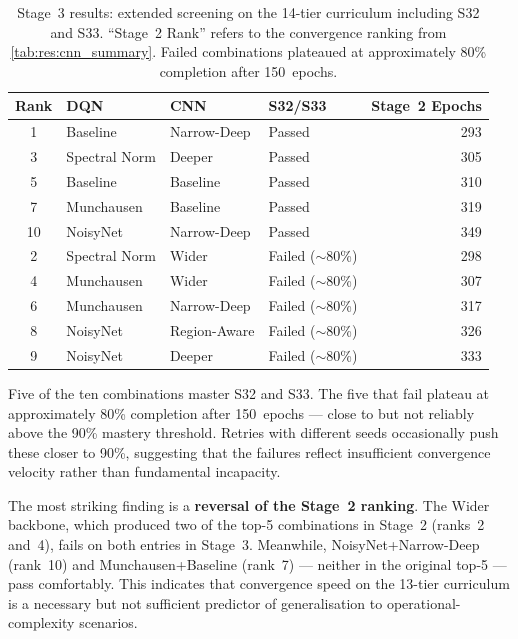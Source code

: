 \begin{table}[H]
  \centering
  \caption{Stage~3 results: extended screening on the 14-tier curriculum including S32 and S33. ``Stage~2 Rank'' refers to the convergence ranking from \cref{tab:res:cnn_summary}. Failed combinations plateaued at approximately 80\% completion after 150~epochs.}
  \label{tab:res:stage3_results}
  \begin{tabular}{@{} c l l l r @{}}
    \toprule
    \textbf{Rank} & \textbf{DQN} & \textbf{CNN} & \textbf{S32/S33} & \textbf{Stage~2 Epochs} \\
    \midrule
    1  & Baseline       & Narrow-Deep    & Passed & 293 \\
    3  & Spectral Norm  & Deeper         & Passed & 305 \\
    5  & Baseline       & Baseline       & Passed & 310 \\
    7  & Munchausen     & Baseline       & Passed & 319 \\
    10 & NoisyNet       & Narrow-Deep    & Passed & 349 \\
    \midrule
    2  & Spectral Norm  & Wider          & Failed (${\sim}$80\%) & 298 \\
    4  & Munchausen     & Wider          & Failed (${\sim}$80\%) & 307 \\
    6  & Munchausen     & Narrow-Deep    & Failed (${\sim}$80\%) & 317 \\
    8  & NoisyNet       & Region-Aware   & Failed (${\sim}$80\%) & 326 \\
    9  & NoisyNet       & Deeper         & Failed (${\sim}$80\%) & 333 \\
    \bottomrule
  \end{tabular}
\end{table}

Five of the ten combinations master S32 and S33. The five that fail plateau at approximately 80\% completion after 150~epochs --- close to but not reliably above the 90\% mastery threshold. Retries with different seeds occasionally push these closer to 90\%, suggesting that the failures reflect insufficient convergence velocity rather than fundamental incapacity.

The most striking finding is a \textbf{reversal of the Stage~2 ranking}. The Wider backbone, which produced two of the top-5 combinations in Stage~2 (ranks~2 and~4), fails on both entries in Stage~3. Meanwhile, NoisyNet+Narrow-Deep (rank~10) and Munchausen+Baseline (rank~7) --- neither in the original top-5 --- pass comfortably. This indicates that convergence speed on the 13-tier curriculum is a necessary but not sufficient predictor of generalisation to operational-complexity scenarios.

